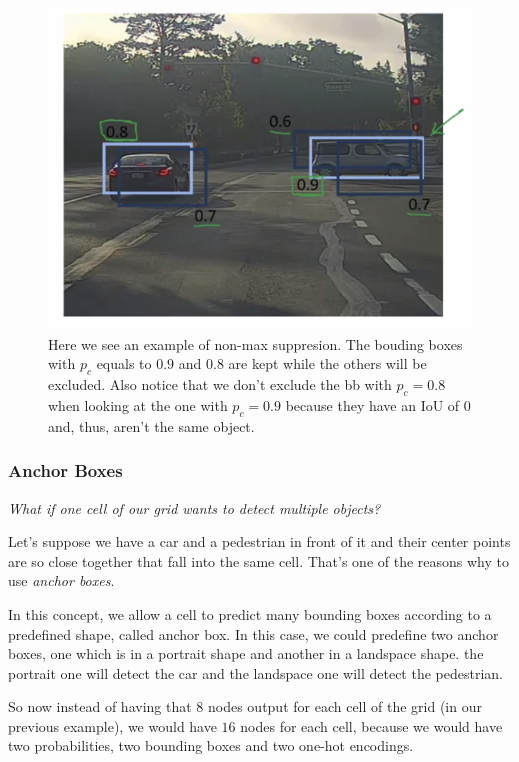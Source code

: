 \documentclass[12pt, a4paper, oneside]{book}
\begin{document}
\begin{figure}[h]
\centering
\includegraphics[scale=0.4]{Res/non_max_suppression_example.png}
\caption{Here we see an example of non-max suppresion. The bouding boxes with
$p_c$ equals to $0.9$ and $0.8$ are kept while the others will be excluded. Also
notice that we don't exclude the bb with $p_c=0.8$ when looking at the one with
$p_c=0.9$ because they have an IoU of $0$ and, thus, aren't the same object.}
\label{non_max_suppression_example.png}
\end{figure}

\subsubsection{Anchor Boxes}%
\label{ssub:anchor_boxes}

\textit{What if one cell of our grid wants to detect multiple objects?}

Let's suppose we have a car and a pedestrian in front of it and their center
points are so close together that fall into the same cell. That's one of the
reasons why to use \textit{anchor boxes}.

In this concept, we allow a cell to predict many bounding boxes according to a
predefined shape, called anchor box. In this case, we could predefine two anchor
boxes, one which is in a portrait shape and another in a landspace shape. the
portrait one will detect the car and the landspace one will detect the
pedestrian.

So now instead of having that $8$ nodes output for each cell of the grid (in our
previous example), we would have $16$ nodes for each cell, because we would have
two probabilities, two bounding boxes and two one-hot encodings.
\end{document}
